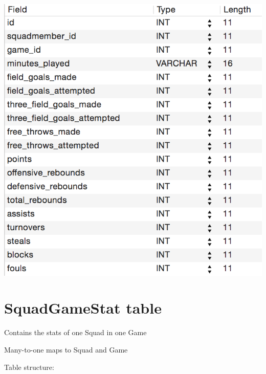 \documentclass[letterpaper,10pt,english]{sphinxmanual}
\begin{document}
\includegraphics{PlayerGameStat_table.png}


\section{SquadGameStat table}
\label{_static/database:squadgamestat-table}
Contains the stats of one Squad in one Game

Many-to-one maps to Squad and Game

Table structure:
\end{document}
